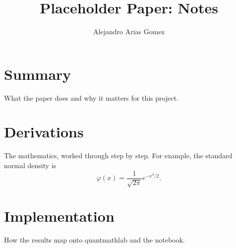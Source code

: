 \documentclass[11pt]{article}
\title{Placeholder Paper: Notes}
\author{Alejandro Arias Gomez}
\date{}
\begin{document}
\maketitle

\section{Summary}

What the paper does and why it matters for this project.

\section{Derivations}

The mathematics, worked through step by step. For example, the standard
normal density is
\begin{equation}
  \varphi(x) = \frac{1}{\sqrt{2\pi}} e^{-x^2/2}.
\end{equation}

\section{Implementation}

How the results map onto quantmathlab and the notebook.
\end{document}
